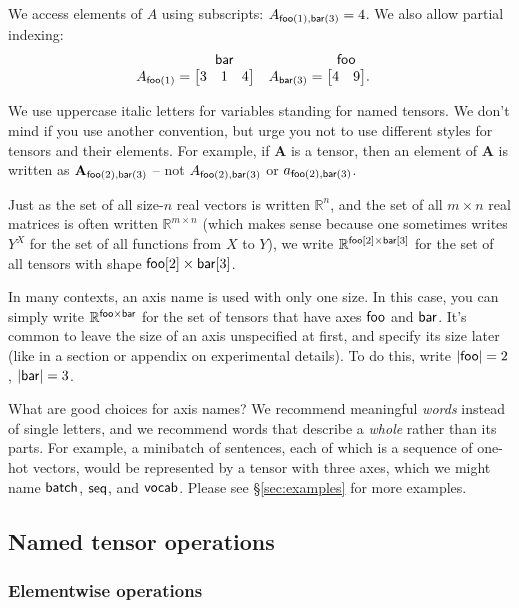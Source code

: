 \documentclass{article}
\makeatletter
\newcommand{\nmatrix}[3]{\name{#1}\begin{array}[b]{@{}c@{}}\name{#2}\\\begin{bmatrix}#3\end{bmatrix}\end{array}}
\makeatother
\begin{document}
We access elements of $A$ using subscripts: $A_{\mathsf{foo}(1), \mathsf{bar}(3)} = 4$.
We also allow partial indexing:
\begin{align*}
A_{\nidx{foo}{1}} &= \nmatrix{}{bar}{
  3 & 1 & 4
}
&
A_{\nidx{bar}{3}} &= \nmatrix{}{foo}{
  4 & 9
}.
\end{align*}

We use uppercase italic letters for variables standing for named tensors. We don't mind if you use another convention, but urge you not to use different styles for tensors and their elements. For example, if $\mathbf{A}$ is a tensor, then an element of $\mathbf{A}$ is written as $\mathbf{A}_{\mathsf{foo}(2), \mathsf{bar}(3)}$ -- 
not $A_{\mathsf{foo}(2),\mathsf{bar}(3)}$ or $a_{\mathsf{foo}(2),\mathsf{bar}(3)}$.

Just as the set of all size-$n$ real vectors is written $\mathbb{R}^n$, and the set of all $m\times n$ real matrices is often written $\mathbb{R}^{m \times n}$ (which makes sense because one sometimes writes $Y^X$ for the set of all functions from $X$ to $Y$), we write $\mathbb{R}^{\mathsf{foo}[2] \times \mathsf{bar}[3]}$ for the set of all tensors with shape $\mathsf{foo}[2] \times \mathsf{bar}[3]$.

In many contexts, an axis name is used with only one size. In this case, you can simply write $\mathbb{R}^{\mathsf{foo} \times \mathsf{bar}}$ for the set of tensors that have axes $\mathsf{foo}$ and $\mathsf{bar}$. It's common to leave the size of an axis unspecified at first, and specify its size later (like in a section or appendix on experimental details). To do this, write $|\mathsf{foo}|=2$, $|\mathsf{bar}|=3$.

What are good choices for axis names? We recommend meaningful \emph{words} instead of single letters, and we recommend words that describe a \emph{whole} rather than its parts. For example, a minibatch of sentences, each of which is a sequence of one-hot vectors, would be represented by a tensor with three axes, which we might name $\mathsf{batch}$, $\mathsf{seq}$, and $\mathsf{vocab}$. Please see \S\ref{sec:examples} for more examples.

\subsection{Named tensor operations}
\label{sec:operations}

\subsubsection{Elementwise operations}
\end{document}
